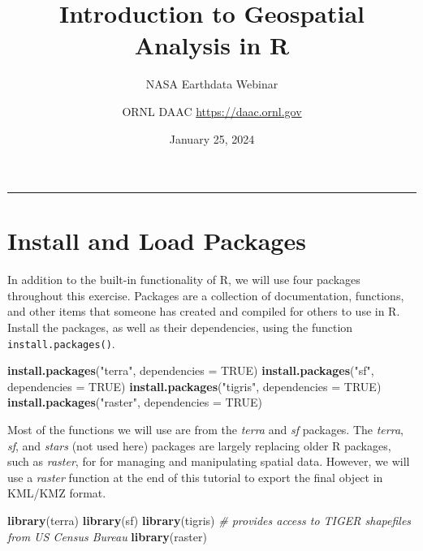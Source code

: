 \documentclass[
]{article}
\title{Introduction to Geospatial Analysis in R}
\subtitle{NASA Earthdata Webinar}
\author{ORNL DAAC \url{https://daac.ornl.gov}}
\date{January 25, 2024}
\newenvironment{Shaded}{\begin{snugshade}}{\end{snugshade}}
\newcommand{\AttributeTok}[1]{\textcolor[rgb]{0.13,0.29,0.53}{#1}}
\newcommand{\CommentTok}[1]{\textcolor[rgb]{0.56,0.35,0.01}{\textit{#1}}}
\newcommand{\ConstantTok}[1]{\textcolor[rgb]{0.56,0.35,0.01}{#1}}
\newcommand{\FunctionTok}[1]{\textcolor[rgb]{0.13,0.29,0.53}{\textbf{#1}}}
\newcommand{\NormalTok}[1]{#1}
\newcommand{\StringTok}[1]{\textcolor[rgb]{0.31,0.60,0.02}{#1}}
\begin{document}
\maketitle

{
\setcounter{tocdepth}{2}
\tableofcontents
}
\begin{center}\rule{0.5\linewidth}{0.5pt}\end{center}

\hypertarget{install-and-load-packages}{%
\section{Install and Load Packages}\label{install-and-load-packages}}

In addition to the built-in functionality of R, we will use four
packages throughout this exercise. Packages are a collection of
documentation, functions, and other items that someone has created and
compiled for others to use in R. Install the packages, as well as their
dependencies, using the function \texttt{install.packages()}.

\begin{Shaded}
\begin{Highlighting}[]
\FunctionTok{install.packages}\NormalTok{(}\StringTok{"terra"}\NormalTok{, }\AttributeTok{dependencies =} \ConstantTok{TRUE}\NormalTok{) }
\FunctionTok{install.packages}\NormalTok{(}\StringTok{"sf"}\NormalTok{, }\AttributeTok{dependencies =} \ConstantTok{TRUE}\NormalTok{) }
\FunctionTok{install.packages}\NormalTok{(}\StringTok{"tigris"}\NormalTok{, }\AttributeTok{dependencies =} \ConstantTok{TRUE}\NormalTok{)}
\FunctionTok{install.packages}\NormalTok{(}\StringTok{"raster"}\NormalTok{, }\AttributeTok{dependencies =} \ConstantTok{TRUE}\NormalTok{)}
\end{Highlighting}
\end{Shaded}

Most of the functions we will use are from the \emph{terra} and
\emph{sf} packages. The \emph{terra}, \emph{sf}, and \emph{stars} (not
used here) packages are largely replacing older R packages, such as
\emph{raster}, for for managing and manipulating spatial data. However,
we will use a \emph{raster} function at the end of this tutorial to
export the final object in KML/KMZ format.

\begin{Shaded}
\begin{Highlighting}[]
\FunctionTok{library}\NormalTok{(terra)}
\FunctionTok{library}\NormalTok{(sf) }
\FunctionTok{library}\NormalTok{(tigris)  }\CommentTok{\# provides access to TIGER shapefiles from US Census Bureau }
\FunctionTok{library}\NormalTok{(raster)}
\end{Highlighting}
\end{Shaded}
\end{document}
